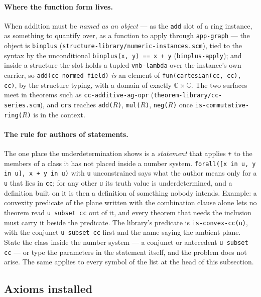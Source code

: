 \paragraph{Where the function form lives.}
When addition must be \emph{named as an object} --- as the \texttt{add} slot
of a ring instance, as something to quantify over, as a function to apply
through \texttt{app-graph} --- the object is \texttt{binplus}
(\texttt{structure-library/numeric-instances.scm}), tied to the syntax by the
unconditional \texttt{binplus(x, y) == x + y} (\texttt{binplus-apply}); and
inside a structure the slot holds a tupled \texttt{vnb-lambda} over the
instance's own carrier, so \texttt{add(cc-normed-field)} \emph{is} an element
of \texttt{fun(cartesian(cc, cc), cc)}, by the structure typing, with a
domain of exactly $\mathbb{C} \times \mathbb{C}$.  The two surfaces meet in
theorems such as \texttt{cc-additive-ag-opr} (\texttt{theorem-library/cc-series.scm}),
and \texttt{crs} reaches \texttt{add($R$)}, \texttt{mul($R$)}, \texttt{neg($R$)}
once \texttt{is-commutative-ring($R$)} is in the context.

\paragraph{The rule for authors of statements.}
The one place the underdetermination shows is a \emph{statement} that applies
\texttt{+} to the members of a class it has not placed inside a number system.
\texttt{forall([x in u, y in u], x + y in u)} with \texttt{u} unconstrained
says what the author means only for a \texttt{u} that lies in \texttt{cc}; for
any other \texttt{u} its truth value is underdetermined, and a definition
built on it is then a definition of something nobody intends.  Example:
a convexity predicate of the plane written with the combination clause
alone lets no theorem read \texttt{u subset cc} out of it, and every
theorem that needs the inclusion must carry it beside the predicate.  The
library's predicate is \texttt{is-convex-cc(u)}, with the conjunct
\texttt{u subset cc} first and the name saying the ambient plane.  State the class inside the
number system --- a conjunct or antecedent \texttt{u subset cc} --- or type
the parameters in the statement itself, and the problem does not arise.  The
same applies to every symbol of the list at the head of this subsection.

\subsection{Axioms installed}

